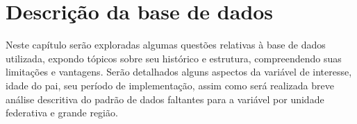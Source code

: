 
\chapter{Descrição da base de dados}\label{Sinasc&DNV}


Neste capítulo serão exploradas algumas questões relativas à base de dados utilizada, expondo tópicos sobre seu histórico e estrutura, compreendendo suas limitações e vantagens. Serão detalhados alguns aspectos da variável de interesse, idade do pai, seu período de implementação, assim como será realizada breve análise descritiva do padrão de dados faltantes para a variável por unidade federativa e grande região.   


%

%

